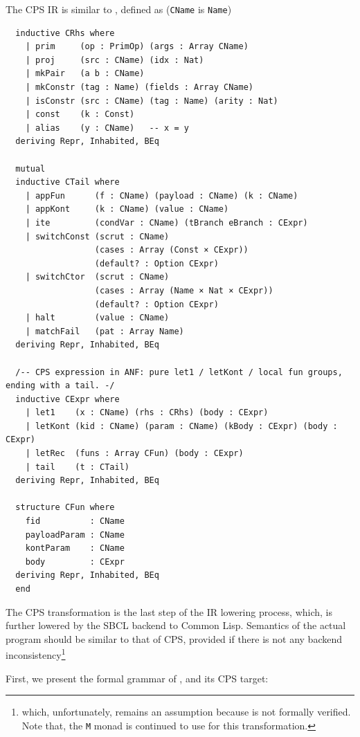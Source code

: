 \documentclass[a4paper, 11pt]{article}
\theoremstyle{remark}\newtheorem*{remark}{Remark}
\theoremstyle{definition}\newtheorem*{definition}{Definition}
\begin{document}
The CPS IR is similar to \Lambdair, defined as (\texttt{CName} is \texttt{Name})
\begin{verbatim}
  inductive CRhs where
    | prim     (op : PrimOp) (args : Array CName)
    | proj     (src : CName) (idx : Nat)
    | mkPair   (a b : CName)
    | mkConstr (tag : Name) (fields : Array CName)
    | isConstr (src : CName) (tag : Name) (arity : Nat)
    | const    (k : Const)
    | alias    (y : CName)   -- x = y
  deriving Repr, Inhabited, BEq

  mutual
  inductive CTail where
    | appFun      (f : CName) (payload : CName) (k : CName)
    | appKont     (k : CName) (value : CName)
    | ite         (condVar : CName) (tBranch eBranch : CExpr)
    | switchConst (scrut : CName)
                  (cases : Array (Const × CExpr))
                  (default? : Option CExpr)
    | switchCtor  (scrut : CName)
                  (cases : Array (Name × Nat × CExpr))
                  (default? : Option CExpr)
    | halt        (value : CName)
    | matchFail   (pat : Array Name)
  deriving Repr, Inhabited, BEq

  /-- CPS expression in ANF: pure let1 / letKont / local fun groups, ending with a tail. -/
  inductive CExpr where
    | let1    (x : CName) (rhs : CRhs) (body : CExpr)
    | letKont (kid : CName) (param : CName) (kBody : CExpr) (body : CExpr)
    | letRec  (funs : Array CFun) (body : CExpr)
    | tail    (t : CTail)
  deriving Repr, Inhabited, BEq

  structure CFun where
    fid          : CName
    payloadParam : CName
    kontParam    : CName
    body         : CExpr
  deriving Repr, Inhabited, BEq
  end
\end{verbatim}

The CPS transformation is the last step of the IR lowering process, which, is further lowered by
the SBCL backend to Common Lisp. Semantics of the actual program should be similar to that of CPS,
provided if there is not any backend inconsistency\footnote{
which, unfortunately, remains an assumption because \Tigris is not formally verified. Note that, the \texttt{M} monad is continued to use for this transformation.
}

First, we present the formal grammar of \Lambdair, and its CPS target:
\end{document}
